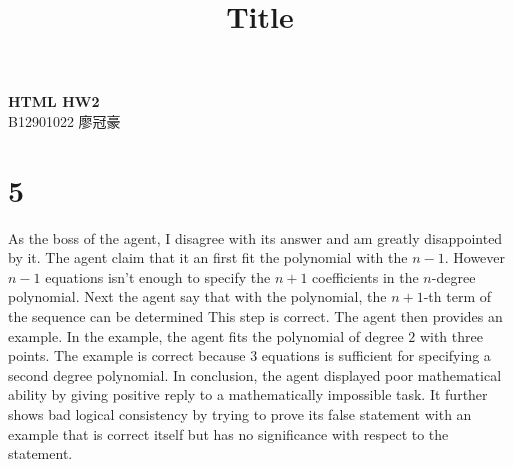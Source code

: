 \documentclass[11pt]{article}
\theoremstyle{definition}
\begin{document}
\setcounter{section}{0}
\title{Title}

\thispagestyle{empty}
\begin{center}
  {\large \bf HTML HW2} \\ 
  B12901022 廖冠豪
\end{center}
\section*{5}
As the boss of the agent, I disagree with its answer and am greatly disappointed by it. The agent claim that it an first fit the polynomial with the $n - 1$. However $n - 1$ equations isn't enough to specify the $n + 1$ coefficients in the $n$-degree polynomial. Next the agent say that with the polynomial, the $n + 1$-th term of the sequence can be determined This step is correct. The agent then provides an example. In the example, the agent fits the polynomial of degree $2$ with three points. The example is correct because $3$ equations is sufficient for specifying a second degree polynomial. In conclusion, the agent displayed poor mathematical ability by giving positive reply to a mathematically impossible task. It further shows bad logical consistency by trying to prove its false statement with an example that is correct itself but has no significance with respect to the statement.
\newpage
\end{document}
